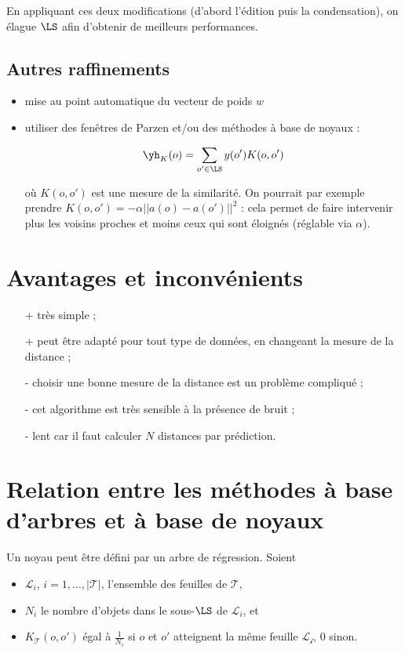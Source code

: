 		En appliquant ces deux modifications (d'abord l'édition puis la condensation), on élague $\LS$ afin d'obtenir de meilleurs performances.
		
		
		\subsection{Autres raffinements}
		
		\begin{itemize}
			\item mise au point automatique du vecteur de poids $w$
			\item utiliser des fenêtres de Parzen et/ou des méthodes à base de noyaux :
			
			$$\yh_K(o) = \sum_{o' \in \LS} y(o') K(o, o')$$
			
			où $K(o, o')$ est une mesure de la similarité. On pourrait par exemple prendre $K(o, o') = -\alpha \vert \vert a(o) - a(o') \vert \vert^2$ : cela permet de faire intervenir plus les voisins proches et moins ceux qui sont éloignés (réglable via $\alpha$).
		\end{itemize}

	\section{Avantages et inconvénients}
		
	\begin{itemize}
		\item[+] très simple ;
		\item[+] peut être adapté pour tout type de données, en changeant la mesure de la distance ;
		\item[-] choisir une bonne mesure de la distance est un problème compliqué ;
		\item[-] cet algorithme est très sensible à la présence de bruit ;
		\item[-] lent car il faut calculer $N$ distances par prédiction.
	\end{itemize}
	
	
	\section{Relation entre les méthodes à base d'arbres et à base de noyaux}
	
	Un noyau peut être défini par un arbre de régression. Soient
	
	\begin{itemize}
		\item $\mathcal{L}_i$, $i = 1, \dots , \vert \mathcal{T} \vert$, l'ensemble des feuilles de $\mathcal{T}$,
		\item $N_i$ le nombre d'objets dans le sous-$\LS$ de $\mathcal{L}_i$, et
		\item $K_\mathcal{T}(o, o')$ égal à $\frac{1}{N_i}$ si $o$ et $o'$ atteignent la même feuille $\mathcal{L_i}$, 0 sinon.
	\end{itemize}
	
